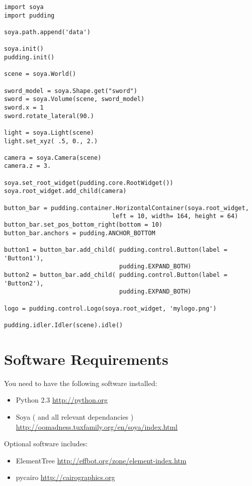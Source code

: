 \documentclass{howto}
\begin{document}
\begin{verbatim}
import soya
import pudding

soya.path.append('data')

soya.init()
pudding.init()

scene = soya.World()

sword_model = soya.Shape.get("sword")
sword = soya.Volume(scene, sword_model)
sword.x = 1
sword.rotate_lateral(90.)

light = soya.Light(scene)
light.set_xyz( .5, 0., 2.)

camera = soya.Camera(scene)
camera.z = 3.

soya.set_root_widget(pudding.core.RootWidget())
soya.root_widget.add_child(camera)

button_bar = pudding.container.HorizontalContainer(soya.root_widget, 
                              left = 10, width= 164, height = 64)
button_bar.set_pos_bottom_right(bottom = 10)
button_bar.anchors = pudding.ANCHOR_BOTTOM

button1 = button_bar.add_child( pudding.control.Button(label = 'Button1'), 
                                pudding.EXPAND_BOTH)
button2 = button_bar.add_child( pudding.control.Button(label = 'Button2'), 
                                pudding.EXPAND_BOTH)

logo = pudding.control.Logo(soya.root_widget, 'mylogo.png')

pudding.idler.Idler(scene).idle()

\end{verbatim}

\section{Software Requirements}

You need to have the following software installed:

\begin{itemize}
  \item  Python 2.3 \url{http://python.org}
  \item  Soya ( and all relevant dependancies ) \url{http://oomadness.tuxfamily.org/en/soya/index.html}
\end{itemize}

Optional software includes:
\begin{itemize}
  \item ElementTree \url{http://effbot.org/zone/element-index.htm}
  \item pycairo \url{http://cairographics.org}
\end{itemize}
\end{document}
